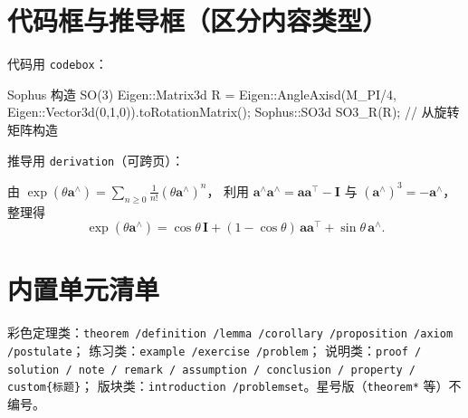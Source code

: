 \section{代码框与推导框（区分内容类型）}
代码用 \texttt{codebox}：
\begin{codebox}[C++]{Sophus 构造 SO(3)}
Eigen::Matrix3d R = Eigen::AngleAxisd(M_PI/4,
                      Eigen::Vector3d(0,1,0)).toRotationMatrix();
Sophus::SO3d SO3_R(R);   // 从旋转矩阵构造
\end{codebox}

推导用 \texttt{derivation}（可跨页）：
\begin{derivation}[罗德里格斯公式]
由 $\exp(\theta\mathbf{a}^\wedge)=\sum_{n\ge 0}\tfrac{1}{n!}(\theta\mathbf{a}^\wedge)^n$，
利用 $\mathbf{a}^\wedge\mathbf{a}^\wedge=\mathbf{a}\mathbf{a}^\top-\mathbf{I}$ 与 $(\mathbf{a}^\wedge)^3=-\mathbf{a}^\wedge$，整理得
\begin{equation*}
  \exp(\theta\mathbf{a}^\wedge)=\cos\theta\,\mathbf{I}+(1-\cos\theta)\,\mathbf{a}\mathbf{a}^\top+\sin\theta\,\mathbf{a}^\wedge .
\end{equation*}
\end{derivation}

\section{内置单元清单}
彩色定理类：\texttt{theorem /\allowbreak  definition /\allowbreak  lemma /\allowbreak  corollary /\allowbreak  proposition /\allowbreak  axiom /\allowbreak  postulate}；
练习类：\texttt{example /\allowbreak  exercise /\allowbreak  problem}；
说明类：\texttt{proof / solution / note / remark / assumption / conclusion / property / custom\{标题\}}；
版块类：\texttt{introduction /\allowbreak  problemset}。星号版（\texttt{theorem*} 等）不编号。
